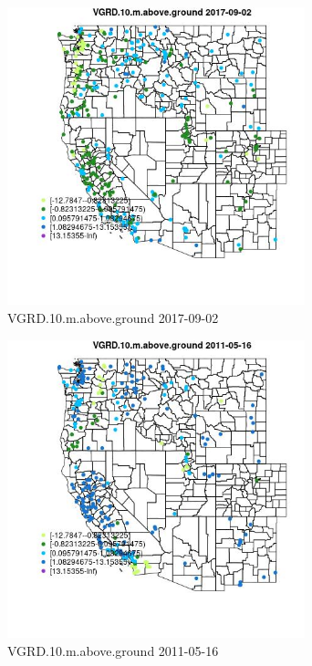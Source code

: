 \begin{figure} 
\centering  
\includegraphics[width=0.77\textwidth]{Code_Outputs/Report_ML_input_PM25_Step4_part_e_de_duplicated_aves_compiled_2019-05-20wNAs_MapObsVGRD10maboveground2017-09-02.jpg} 
\caption{\label{fig:Report_ML_input_PM25_Step4_part_e_de_duplicated_aves_compiled_2019-05-20wNAsMapObsVGRD10maboveground2017-09-02}VGRD.10.m.above.ground 2017-09-02} 
\end{figure} 
 

\begin{figure} 
\centering  
\includegraphics[width=0.77\textwidth]{Code_Outputs/Report_ML_input_PM25_Step4_part_e_de_duplicated_aves_compiled_2019-05-20wNAs_MapObsVGRD10maboveground2011-05-16.jpg} 
\caption{\label{fig:Report_ML_input_PM25_Step4_part_e_de_duplicated_aves_compiled_2019-05-20wNAsMapObsVGRD10maboveground2011-05-16}VGRD.10.m.above.ground 2011-05-16} 
\end{figure} 
 

